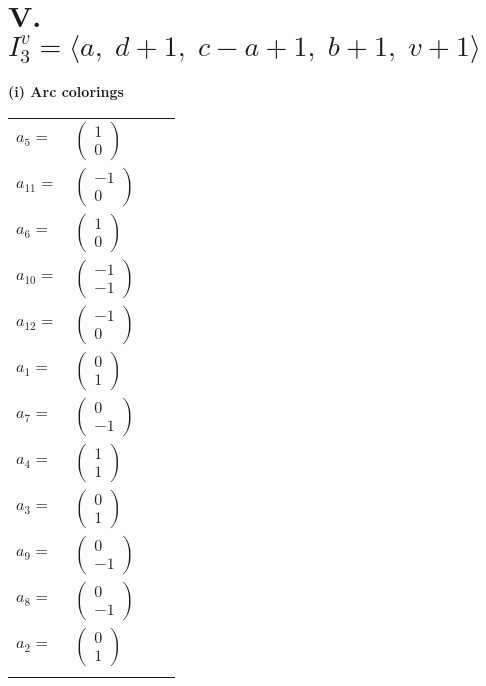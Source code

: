 \documentclass[1p]{elsarticle_modified}
\theoremstyle{definition}
\begin{document}
\centering \section*{V. $I^v_{3}= \langle a,\;d+1,\;c- a+1,\;b+1,\;v+1 \rangle$}
\flushleft \textbf{(i) Arc colorings}\\
\begin{tabular}{m{7pt} m{180pt} m{7pt} m{180pt} }
\flushright $a_{5}=$&$\begin{pmatrix}1\\0\end{pmatrix}$ \\
\flushright $a_{11}=$&$\begin{pmatrix}-1\\0\end{pmatrix}$ \\
\flushright $a_{6}=$&$\begin{pmatrix}1\\0\end{pmatrix}$ \\
\flushright $a_{10}=$&$\begin{pmatrix}-1\\-1\end{pmatrix}$ \\
\flushright $a_{12}=$&$\begin{pmatrix}-1\\0\end{pmatrix}$ \\
\flushright $a_{1}=$&$\begin{pmatrix}0\\1\end{pmatrix}$ \\
\flushright $a_{7}=$&$\begin{pmatrix}0\\-1\end{pmatrix}$ \\
\flushright $a_{4}=$&$\begin{pmatrix}1\\1\end{pmatrix}$ \\
\flushright $a_{3}=$&$\begin{pmatrix}0\\1\end{pmatrix}$ \\
\flushright $a_{9}=$&$\begin{pmatrix}0\\-1\end{pmatrix}$ \\
\flushright $a_{8}=$&$\begin{pmatrix}0\\-1\end{pmatrix}$ \\
\flushright $a_{2}=$&$\begin{pmatrix}0\\1\end{pmatrix}$\\&\end{tabular}
\end{document}
